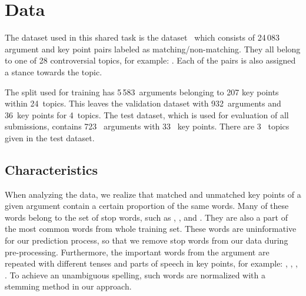 \section{Data}\label{data}

The dataset used in this shared task is the \ArgKP dataset~\cite{Bar-HaimEFKLS2020} which consists of 24\,083 argument and key point pairs labeled as matching/non-matching. They all belong to one of 28 controversial topics, for example: . Each of the pairs is also assigned a stance towards the topic. 

The split used for training has 5\,583~arguments belonging to 207 key points within 24~topics. This leaves the 
validation dataset with 932~arguments and 36~key points for 4~topics. The test dataset, which is used for evaluation of all submissions, contains 723~ arguments with 33~ key points. There are 3~ topics given in the test dataset.

\subsection{Characteristics}


When analyzing the data, we realize that matched and unmatched key points of a given argument contain a certain proportion of the same words. 
Many of these words belong to the set of stop words, such as , , and .
They are also a part of the most common words from whole training set.
These words are uninformative for our prediction process, so that we remove stop words from our data during pre-processing. 
Furthermore, the important words from the argument are repeated with different tenses and parts of speech in key points, for example: , , , . 
To achieve an unambiguous spelling, such words are normalized with a stemming method in our approach. 

